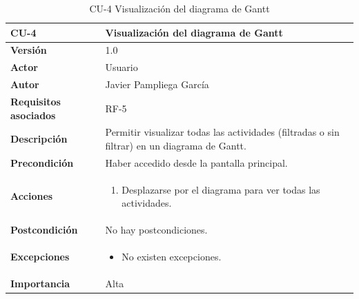\begin{table}[p]
	\centering
	\begin{tabularx}{\linewidth}{ p{} p{} }
		\toprule
		\textbf{CU-4}    & \textbf{Visualización del diagrama de Gantt}\\
		\toprule
		\textbf{Versión}              & 1.0    \\
            \textbf{Actor}                & Usuario \\
		\textbf{Autor}                & Javier Pampliega García \\
		\textbf{Requisitos asociados} & RF-5\\
		\textbf{Descripción}          & Permitir visualizar todas las actividades (filtradas o sin filtrar) en un diagrama de Gantt. \\
		\textbf{Precondición}         & Haber accedido desde la pantalla principal. \\
		\textbf{Acciones}             &
		\begin{enumerate}
			\def\labelenumi{\arabic{enumi}.}
			\tightlist
			\item Desplazarse por el diagrama para ver todas las actividades.
		\end{enumerate}\\
		\textbf{Postcondición}        & No hay postcondiciones. \\
		\textbf{Excepciones}          & \begin{itemize}
		    \item No existen excepciones.
		\end{itemize} \\
		\textbf{Importancia}          & Alta \\
		\bottomrule
	\end{tabularx}
	\caption{CU-4 Visualización del diagrama de Gantt}
\end{table}

